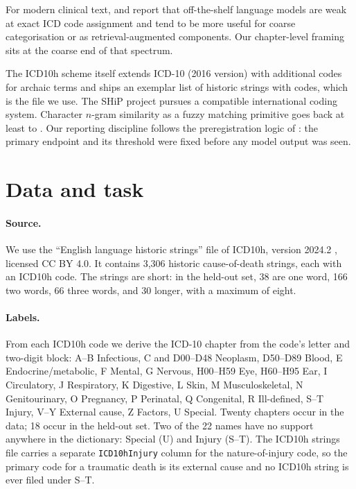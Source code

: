 \documentclass[11pt]{article}
\begin{document}
For modern clinical text, \citet{soroush2024poor} and \citet{boyle2023automated} report that off-the-shelf language models are weak at exact ICD code assignment and tend to be more useful for coarse categorisation or as retrieval-augmented components. Our chapter-level framing sits at the coarse end of that spectrum.

The ICD10h scheme itself \citep{reid2024icd10h} extends ICD-10 (2016 version) \citep{who2016icd10} with additional codes for archaic terms and ships an exemplar list of historic strings with codes, which is the file we use. The SHiP project \citep{janssens2021ship} pursues a compatible international coding system. Character $n$-gram similarity as a fuzzy matching primitive goes back at least to \citet{kondrak2005ngram}. Our reporting discipline follows the preregistration logic of \citet{nosek2018prereg}: the primary endpoint and its threshold were fixed before any model output was seen.

\section{Data and task}
\label{sec:data}

\paragraph{Source.} We use the ``English language historic strings'' file of ICD10h, version 2024.2 \citep{reid2024icd10h}, licensed CC BY 4.0. It contains 3,306 historic cause-of-death strings, each with an ICD10h code. The strings are short: in the held-out set, 38 are one word, 166 two words, 66 three words, and 30 longer, with a maximum of eight.

\paragraph{Labels.} From each ICD10h code we derive the ICD-10 chapter from the code's letter and two-digit block: A--B Infectious, C and D00--D48 Neoplasm, D50--D89 Blood, E Endocrine/metabolic, F Mental, G Nervous, H00--H59 Eye, H60--H95 Ear, I Circulatory, J Respiratory, K Digestive, L Skin, M Musculoskeletal, N Genitourinary, O Pregnancy, P Perinatal, Q Congenital, R Ill-defined, S--T Injury, V--Y External cause, Z Factors, U Special. Twenty chapters occur in the data; 18 occur in the held-out set. Two of the 22 names have no support anywhere in the dictionary: Special (U) and Injury (S--T). The ICD10h strings file carries a separate \texttt{ICD10hInjury} column for the nature-of-injury code, so the primary code for a traumatic death is its external cause and no ICD10h string is ever filed under S--T.
\end{document}
